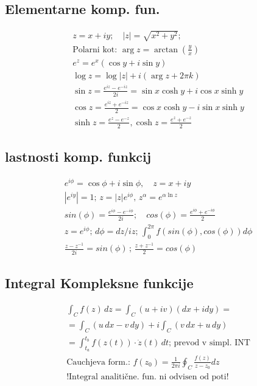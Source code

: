 \documentclass[a4paper,fleqn]{article} %
\begin{document}
\subsection*{Elementarne komp. fun.}
\begin{gather*}
    z = x + iy; \quad |z| = \sqrt{x^2 + y^2}; \quad\\
    \text{Polarni kot: } \arg z = \arctan\left(\frac{y}{x}\right) \\
    e^z = e^x(\cos y + i\sin y)\\
    \log z = \log|z| + i(\arg z + 2\pi k)\\
    \sin z = \frac{e^{iz} - e^{-iz}}{2i} = \sin x \cosh y + i \cos x \sinh y\\
    \cos z = \frac{e^{iz} + e^{-iz}}{2} = \cos x \cosh y - i \sin x \sinh y\\
    \sinh z = \frac{e^z - e^{-z}}{2}, \cosh z = \frac{e^z + e^{-z}}{2}
\end{gather*}

\subsection*{lastnosti komp. funkcij}
\begin{gather*}
    e^{i\phi} = \cos \phi + i \sin \phi, \quad z = x+iy \\
    |e^{iy}| = 1; \, z = |z|e^{i\phi}, \, z^\alpha = e^{\alpha \ln z} \\
    sin(\phi) = \frac{e^{i\phi} - e^{-i\phi}}{2i}; \quad cos(\phi) = \frac{e^{i\phi} + e^{-i\phi}}{2} \\
    z = e^{i\phi}; \,d\phi = {dz}/{iz}; \, \int_{0}^{2\pi}f(sin(\phi),cos(\phi))d\phi\\
    \frac{z - z^{-1}}{2i} = sin(\phi)\, ; \,\frac{z + z^{-1}}{2} = cos(\phi) 
\end{gather*}

\subsection*{Integral Kompleksne funkcije}
\begin{gather*}
    \int_C f(z) \, dz = \int_C (u+iv)(dx+idy) = \\= \int_C (u \, dx - v \, dy) + i \int_C (v \, dx + u \, dy)\\
    = \int_{t_a}^{t_b} f(z(t)) \cdot \dot{z}(t) \, dt; \, \text{prevod v simpl. INT}\\
    \text{Cauchjeva form.: } f(z_0) = \frac{1}{2\pi i} \oint_C \frac{f(z)}{z - z_0} dz\\
    \text{!Integral analitične. fun. ni odvisen od poti!}
\end{gather*}
\end{document}
